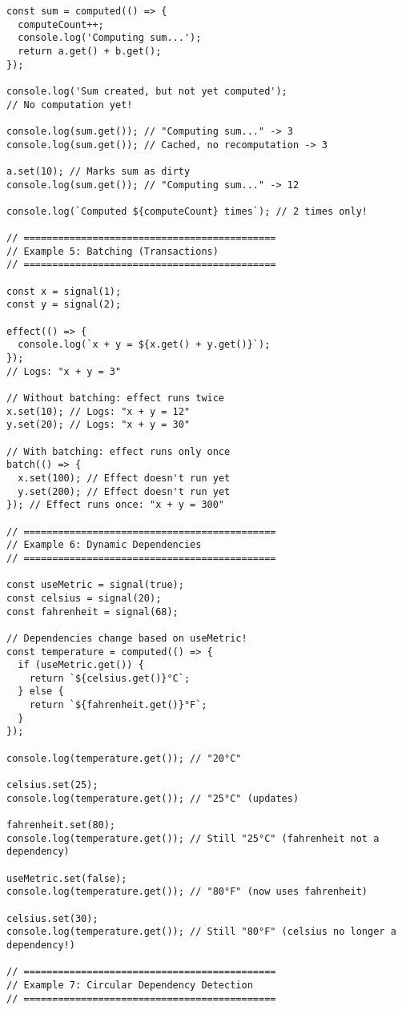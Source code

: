 \documentclass[11pt]{article}
\begin{document}
\begin{verbatim}
const sum = computed(() => {
  computeCount++;
  console.log('Computing sum...');
  return a.get() + b.get();
});

console.log('Sum created, but not yet computed');
// No computation yet!

console.log(sum.get()); // "Computing sum..." -> 3
console.log(sum.get()); // Cached, no recomputation -> 3

a.set(10); // Marks sum as dirty
console.log(sum.get()); // "Computing sum..." -> 12

console.log(`Computed ${computeCount} times`); // 2 times only!

// ============================================
// Example 5: Batching (Transactions)
// ============================================

const x = signal(1);
const y = signal(2);

effect(() => {
  console.log(`x + y = ${x.get() + y.get()}`);
});
// Logs: "x + y = 3"

// Without batching: effect runs twice
x.set(10); // Logs: "x + y = 12"
y.set(20); // Logs: "x + y = 30"

// With batching: effect runs only once
batch(() => {
  x.set(100); // Effect doesn't run yet
  y.set(200); // Effect doesn't run yet
}); // Effect runs once: "x + y = 300"

// ============================================
// Example 6: Dynamic Dependencies
// ============================================

const useMetric = signal(true);
const celsius = signal(20);
const fahrenheit = signal(68);

// Dependencies change based on useMetric!
const temperature = computed(() => {
  if (useMetric.get()) {
    return `${celsius.get()}°C`;
  } else {
    return `${fahrenheit.get()}°F`;
  }
});

console.log(temperature.get()); // "20°C"

celsius.set(25);
console.log(temperature.get()); // "25°C" (updates)

fahrenheit.set(80);
console.log(temperature.get()); // Still "25°C" (fahrenheit not a dependency)

useMetric.set(false);
console.log(temperature.get()); // "80°F" (now uses fahrenheit)

celsius.set(30);
console.log(temperature.get()); // Still "80°F" (celsius no longer a dependency!)

// ============================================
// Example 7: Circular Dependency Detection
// ============================================


\end{verbatim}
\end{document}
